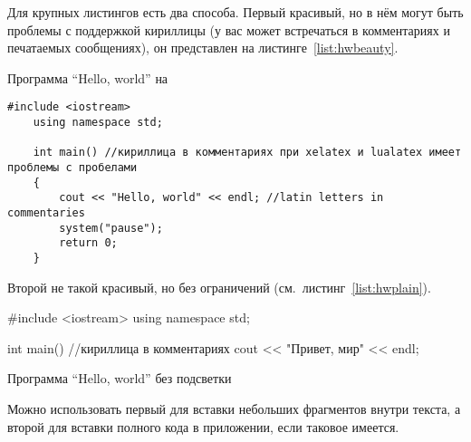 Для крупных листингов есть два способа. Первый красивый, но в нём могут быть проблемы с поддержкой кириллицы (у вас может встречаться в комментариях и
печатаемых сообщениях), он представлен на листинге~\ref{list:hwbeauty}.
\begin{ListingEnv}[H]%
    \caption{Программа “Hello, world” на \protect\cpp}
    \label{list:hwbeauty}
    \begin{lstlisting}[language={[ISO]C++}]
	#include <iostream>
	using namespace std;

	int main() //кириллица в комментариях при xelatex и lualatex имеет проблемы с пробелами
	{
		cout << "Hello, world" << endl; //latin letters in commentaries
		system("pause");
		return 0;
	}
    \end{lstlisting}
\end{ListingEnv}%
Второй не такой красивый, но без ограничений (см.~листинг~\ref{list:hwplain}).
\begin{ListingEnv}[H]
    \begin{Verb}
        
        #include <iostream>
        using namespace std;
        
        int main() //кириллица в комментариях
        {
            cout << "Привет, мир" << endl;
        }
    \end{Verb}
    \caption{Программа “Hello, world” без подсветки}
    \label{list:hwplain}
\end{ListingEnv}

Можно использовать первый для вставки небольших фрагментов
внутри текста, а второй для вставки полного
кода в приложении, если таковое имеется.


